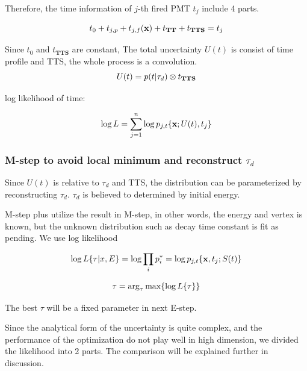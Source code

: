 \documentclass{article}
\begin{document}
	Therefore, the time information of $j$-th fired PMT $t_j$ include 4 parts. 

	\begin{equation}
	\numberwithin{equation}{section}
	t_{0} + t_{j,p} + t_{j,f}({\textbf x}) +  t_{\textbf{TT}} + t_{\textbf{TTS}}= t_{j} 
	\end{equation}	
	
	\par Since $t_{0}$ and $t_{\textbf{TTS}}$ are constant, The total uncertainty $U(t)$ is consist of time profile and TTS, the whole process is a convolution.
	\begin{equation}
	\numberwithin{equation}{section}
		U(t) =  p(t|\tau_d)\otimes t_{\textbf{TTS}}
	\end{equation}

	\par log likelihood of time:

	\begin{equation}
		\numberwithin{equation}{section}
		\log L = \sum_{j=1}^n \log p_{j,t}\{{\textbf x}; U(t), t_{j}\}
	\end{equation}
\subsubsection{M-step to avoid local minimum and reconstruct $\tau_d$ }
\par Since $U(t)$ is relative to $\tau_d$ and TTS, the distribution can be parameterized by reconstructing $\tau_d$. $\tau_d$ is believed to determined by initial energy. 
\par M-step plus utilize the result in M-step, in other words, the energy and vertex is known, but the unknown distribution such as decay time constant is fit as pending. We use log likelihood 


	\begin{equation}
	\numberwithin{equation}{section}
		\log L\{\tau|x,E\} = \log \prod_{i} p^*_i = \log p_{j,t}\{{\textbf x},t_{j};S(t)\}
	\end{equation}

	\begin{equation}
	\numberwithin{equation}{section}
		\tau = \arg_\tau{\max\{\log L\{\tau\}\}}
	\end{equation}
\par The best $\tau$ will be a fixed parameter in next E-step.
\par Since the analytical form of the uncertainty is quite complex, and the performance of the optimization do not play well in high dimension, we divided the likelihood into 2 parts. The comparison will be explained further in discussion.
\end{document}

